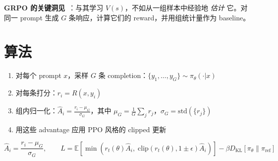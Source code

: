 \textbf{GRPO 的关键洞见}~\cite{shao2024deepseekmath}：与其学习 $V(s)$，不如从一组样本中经验地 \emph{估计} 它。对同一 prompt 生成 $G$ 条响应，计算它们的 reward，并用组统计量作为 baseline。

\section{算法}
\label{algorithm}

\begin{enumerate}
  \item 对每个 prompt $x$，采样 $G$ 条 completion：$\{y_1, \ldots, y_G\} \sim \pi_\theta(\cdot|x)$
  \item 对每条打分：$r_i = R(x, y_i)$
  \item 组内归一化：$\hat{A}_i = \frac{r_i - \mu_G}{\sigma_G}$，其中 $\mu_G = \frac{1}{G}\sum_j r_j$，$\sigma_G = \text{std}(\{r_j\})$
  \item 用这些 advantage 应用 PPO 风格的 clipped 更新
\end{enumerate}

\begin{equation}
\boxed{\hat{A}_i = \frac{r_i - \mu_G}{\sigma_G}, \qquad L = \mathbb{E}\left[\min\left(r_t(\theta)\hat{A}_i,\; \text{clip}(r_t(\theta), 1{\pm}\epsilon)\hat{A}_i\right)\right] - \beta D_\text{KL}[\pi_\theta\|\pi_\text{ref}]}
\end{equation}

